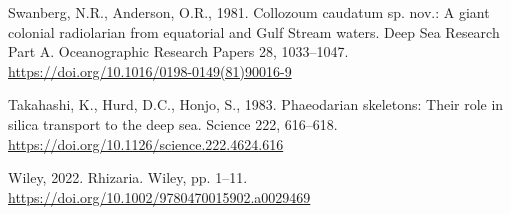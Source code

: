 \documentclass[
  letterpaper,
  DIV=11,
  numbers=noendperiod]{scrartcl}
\newlength{\cslhangindent}
\newlength{\cslentryspacingunit} %
\newenvironment{CSLReferences}[2] %
 {%
  \setlength{\parindent}{0pt}
  \ifodd #1
  \let\oldpar\par
  \def\par{\hangindent=\cslhangindent\oldpar}
  \fi
  \setlength{\parskip}{#2\cslentryspacingunit}
 }%
 {}
\begin{document}
\begin{CSLReferences}{1}{0}
\leavevmode{}%
Swanberg, N.R., Anderson, O.R., 1981. Collozoum caudatum sp. nov.: A
giant colonial radiolarian from equatorial and Gulf Stream waters. Deep
Sea Research Part A. Oceanographic Research Papers 28, 1033--1047.
\url{https://doi.org/10.1016/0198-0149(81)90016-9}

\leavevmode{}%
Takahashi, K., Hurd, D.C., Honjo, S., 1983. Phaeodarian skeletons: Their
role in silica transport to the deep sea. Science 222, 616--618.
\url{https://doi.org/10.1126/science.222.4624.616}

\leavevmode{}%
Wiley, 2022. Rhizaria. Wiley, pp. 1--11.
\url{https://doi.org/10.1002/9780470015902.a0029469}

\end{CSLReferences}
\end{document}

